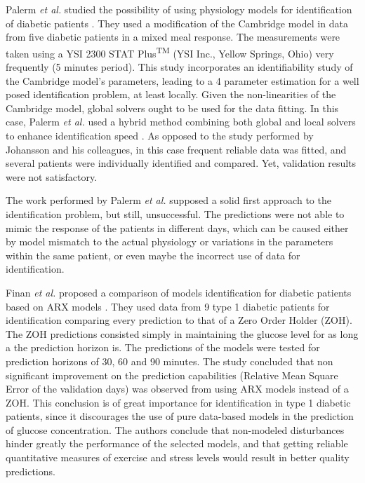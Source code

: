 Palerm \textit{et al.} studied the possibility of using physiology models for identification of diabetic patients \cite{palerm2006robust}. They used a modification of the Cambridge model in data from five diabetic patients in a mixed meal response. The measurements were taken using a YSI 2300 STAT Plus\textsuperscript{TM} (YSI Inc., Yellow Springs, Ohio) very frequently (5 minutes period). This study incorporates an identifiability study of the Cambridge model's parameters, leading to a 4 parameter estimation for a well posed identification problem, at least locally. Given the non-linearities of the Cambridge model, global solvers ought to be used for the data fitting. In this case, Palerm \textit{et al.} used a hybrid method combining both global and local solvers to enhance identification speed \cite{rodriguez2006hybrid}. As opposed to the study performed by Johansson and his colleagues, in this case frequent reliable data was fitted, and several patients were individually identified and compared. Yet, validation results were not satisfactory.

The work performed by Palerm \textit{et al.} supposed a solid first approach to the identification problem, but still, unsuccessful. The predictions were not able to mimic the response of the patients in different days, which can be caused either by model mismatch to the actual physiology or variations in the parameters within the same patient, or even maybe the incorrect use of data for identification.

Finan \textit{et al.} proposed a comparison of models identification for diabetic patients based on ARX models \cite{finan2009experimental}. They used data from 9 type 1 diabetic patients for identification comparing every prediction to that of a Zero Order Holder (ZOH). The ZOH predictions consisted simply in maintaining the glucose level for as long a the prediction horizon is. The predictions of the models were tested for prediction horizons of 30, 60 and 90 minutes. The study concluded that non significant improvement on the prediction capabilities (Relative Mean Square Error of the validation days) was observed from using ARX models instead of a ZOH. This conclusion is of great importance for identification in type 1 diabetic patients, since it discourages the use of pure data-based models in the prediction of glucose concentration. The authors conclude that non-modeled disturbances hinder greatly the performance of the selected models, and that getting reliable quantitative measures of exercise and stress levels would result in better quality predictions.

